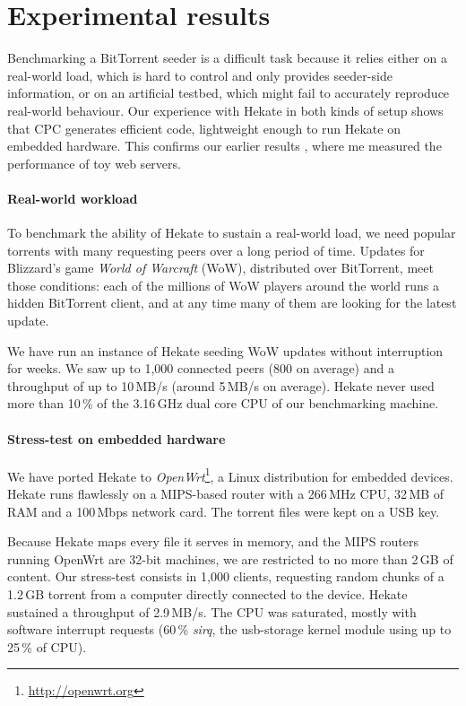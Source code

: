 \documentclass{easychair}
\begin{document}
\section{Experimental results}
\label{sec:experimental-results}

Benchmarking a BitTorrent seeder is a difficult task because it relies
either on a real-world load, which is hard to control and only provides
seeder-side information, or on an artificial testbed, which might fail
to accurately reproduce real-world behaviour.  Our experience with
Hekate in both kinds of setup shows that CPC generates efficient code,
lightweight enough to run Hekate on embedded hardware.  This confirms
our earlier results \cite{kerneis}, where me measured the performance of
toy web servers.

\paragraph{Real-world workload}
To benchmark the ability of Hekate to sustain a real-world load, we need
popular torrents with many requesting peers over a long period of time.
Updates for Blizzard's game \textit{World of Warcraft} (WoW), distributed
over BitTorrent, meet those conditions: each of the millions of WoW players
around the world runs a hidden BitTorrent client, and at any time many of
them are looking for the latest update.

We have run an instance of Hekate seeding WoW updates without interruption
for weeks.  We saw up to 1,000 connected peers (800 on average) and
a throughput of up to 10\,MB/s (around 5\,MB/s on average).
Hekate never used more than 10\,\% of the 3.16\,GHz dual core CPU of our
benchmarking machine.

\paragraph{Stress-test on embedded hardware}
We have ported Hekate to \emph{OpenWrt}\footnote{\url{http://openwrt.org}},
a Linux distribution for embedded devices.  Hekate runs flawlessly on
a MIPS-based router with a 266\,MHz CPU, 32\,MB of RAM and a 100\,Mbps
network card.  The torrent files were kept on a USB key.

Because Hekate maps every file it serves in memory, and the MIPS routers
running OpenWrt are 32-bit machines, we are restricted to no more than 2\,GB
of content.  Our stress-test consists in 1,000 clients, requesting random
chunks of a 1.2\,GB torrent from a computer directly connected to the
device.  Hekate sustained a throughput of 2.9\,MB/s.  The CPU was
saturated, mostly with software interrupt requests (60\,\% \textit{sirq},
the usb-storage kernel module using up to 25\,\% of CPU).
\end{document}
